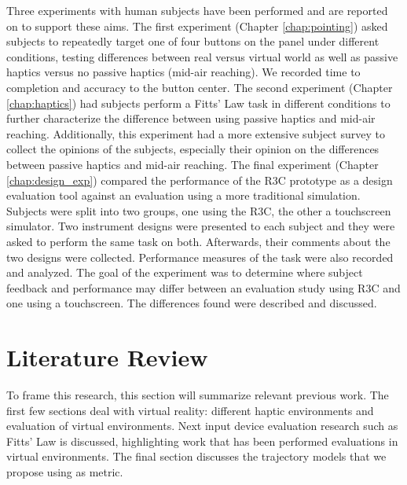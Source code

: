 Three experiments with human subjects have been performed and are reported on to support these aims.
The first experiment (Chapter \ref{chap:pointing}) asked subjects to repeatedly target one of four buttons on the panel under different conditions, testing differences between real versus virtual world as well as passive haptics versus no passive haptics (mid-air reaching).
We recorded time to completion and accuracy to the button center.
The second experiment (Chapter \ref{chap:haptics}) had subjects perform a Fitts' Law task in different conditions to further characterize the difference between using passive haptics and mid-air reaching.
Additionally, this experiment had a more extensive subject survey to collect the opinions of the subjects, especially their opinion on the differences between passive haptics and mid-air reaching.
The final experiment (Chapter \ref{chap:design_exp}) compared the performance of the R3C prototype as a design evaluation tool against an evaluation using a more traditional simulation.
Subjects were split into two groups, one using the R3C, the other a touchscreen simulator.
Two instrument designs were presented to each subject and they were asked to perform the same task on both.
Afterwards, their comments about the two designs were collected.
Performance measures of the task were also recorded and analyzed.
The goal of the experiment was to determine where subject feedback and performance may differ between an evaluation study using R3C and one using a touchscreen.
The differences found were described and discussed.


\section{Literature Review}
\label{literature-review}

To frame this research, this section will summarize relevant previous work.
The first few sections deal with virtual reality: different haptic environments and evaluation of virtual environments.
Next input device evaluation research such as Fitts' Law is discussed, highlighting work that has been performed evaluations in virtual environments.
The final section discusses the trajectory models that we propose using as%
metric.

